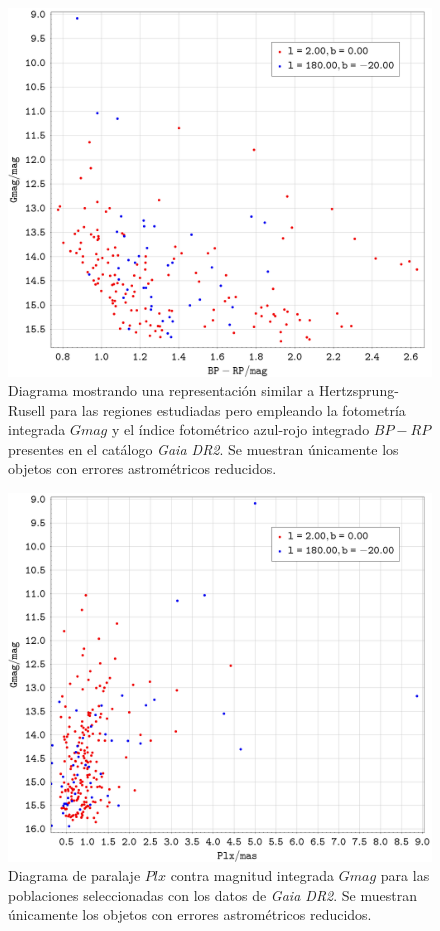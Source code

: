 \documentclass[a4paper,fleqn,usenatbib]{mnras}
\begin{document}
\begin{figure}
  \includegraphics[width=\linewidth]{img/ejercicio1_bprp_gmag_filtered}
  \caption{Diagrama mostrando una representación similar a Hertzsprung-Rusell para las regiones estudiadas pero empleando la fotometría integrada $Gmag$ y el índice fotométrico azul-rojo integrado $BP-RP$ presentes en el catálogo \emph{Gaia DR2}. Se muestran únicamente los objetos con errores astrométricos reducidos.}
  \label{fig:e1_bprpmag_filtered}
\end{figure}

\begin{figure}
  \includegraphics[width=\linewidth]{img/ejercicio1_plx_gmag_filtered}
  \caption{Diagrama de paralaje $Plx$ contra magnitud integrada $Gmag$ para las poblaciones seleccionadas con los datos de \emph{Gaia DR2}. Se muestran únicamente los objetos con errores astrométricos reducidos.}
  \label{fig:e1_plx_filtered}
\end{figure}
\end{document}
